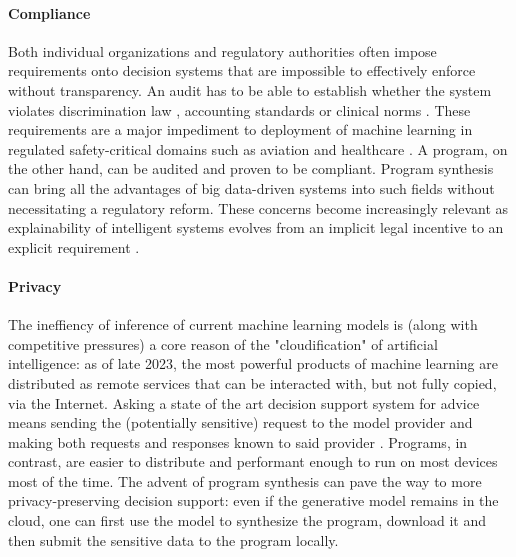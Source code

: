 \paragraph{Compliance}

Both individual organizations and regulatory authorities often impose requirements onto decision systems that are impossible to effectively enforce without transparency. 
An audit has to be able to establish whether the system violates discrimination law \cite{hochDiscriminationSakeFairness2024, schererApplyingOldRules2019}, accounting standards \cite{julischComplianceDesignBridging2011} or clinical norms \cite{flodgrenExternalInspectionCompliance}.
These requirements are a major impediment to deployment of machine learning in regulated safety-critical domains such as aviation \cite{torensGuidelinesRegulatoryFramework2021, vidotQualificationAvionicSoftware2024} and healthcare \cite{granlundRegulatoryCompliantMLOpsOravizio2021}.
A program, on the other hand, can be audited and proven to be compliant. 
Program synthesis can bring all the advantages of big data-driven systems into such fields without necessitating a regulatory reform.
These concerns become increasingly relevant as explainability of intelligent systems evolves from an implicit legal incentive \cite{hackerExplainableAIContract2020} to an explicit requirement \cite{linardatosExplainableAiReview2020}.

\paragraph{Privacy}

The ineffiency of inference of current machine learning models is (along with competitive pressures) a core reason of the "cloudification" of artificial intelligence: as of late 2023, the most powerful products of machine learning \cite{achiamGpt4TechnicalReport2023} are distributed as remote services that can be interacted with, but not fully copied, via the Internet.
Asking a state of the art decision support system for advice means sending the (potentially sensitive) request to the model provider and making both requests and responses known to said provider \cite{PrivacyPolicy}.
Programs, in contrast, are easier to distribute and performant enough to run on most devices most of the time.
The advent of program synthesis can pave the way to more privacy-preserving decision support: even if the generative model remains in the cloud, one can first use the model to synthesize the program, download it and then submit the sensitive data to the program locally.

